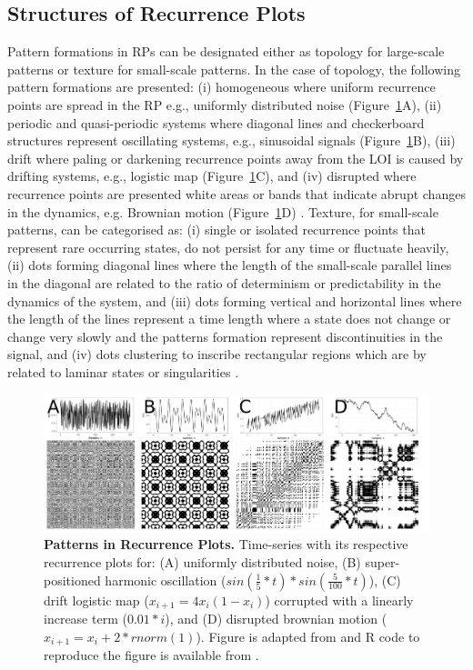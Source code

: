 \subsection{Structures of Recurrence Plots}
Pattern formations in RPs can be designated either 
as topology for large-scale patterns or texture for small-scale patterns.
In the case of topology, the following pattern formations are presented:
(i) homogeneous where uniform recurrence points are spread in the RP e.g., 
uniformly distributed noise (Figure~\ref{fig:rp2}A), 
(ii) periodic and quasi-periodic systems where diagonal lines and 
checkerboard structures represent oscillating systems, e.g., sinusoidal 
signals (Figure~\ref{fig:rp2}B), 
(iii) drift where paling or darkening recurrence points away from 
the LOI is caused by drifting systems, 
e.g., logistic map (Figure~\ref{fig:rp2}C), and
(iv) disrupted where recurrence points are presented white areas or 
bands that indicate abrupt changes in the dynamics, e.g. Brownian motion 
(Figure~\ref{fig:rp2}D) \citep{eckmann1987, marwan2015}.
Texture, for small-scale patterns, can be categorised as:
(i) single or isolated recurrence points that represent rare occurring 
states, do not persist for any time or fluctuate heavily,
(ii) dots forming diagonal lines where the length of the small-scale parallel 
lines in the diagonal are related to the ratio of determinism or 
predictability in the dynamics of the system, and
(iii) dots forming vertical and horizontal lines where the length of the 
lines represent a time length where a state does not change or change very 
slowly and the patterns formation represent discontinuities in the signal, and
(iv) dots clustering to inscribe rectangular regions which are by related 
to laminar states or singularities \citep{marwan2015}.

\begin{figure}
  \centering
    \includegraphics[width=1.0\textwidth]{rpsp}
    \caption{
	{\bf Patterns in Recurrence Plots.} 
	Time-series with its respective recurrence plots for:
	(A) uniformly distributed noise,
	(B) super-positioned harmonic oscillation 
	($sin( \frac{1}{5}*t) * sin( \frac{5}{100}*t) $),
	(C) drift logistic map ($x_{i+1} = 4 x_i (1- x_i) $) corrupted 
	with a linearly increase term ($0.01*i$), and
	(D) disrupted brownian motion  ($x_{i+1} = x_i + 2*rnorm(1) $).
	Figure is adapted from \cite{marwan2015} and R code to reproduce 
	the figure is available from \cite{hwum2018}.
	}
    \label{fig:rp2}
\end{figure}

